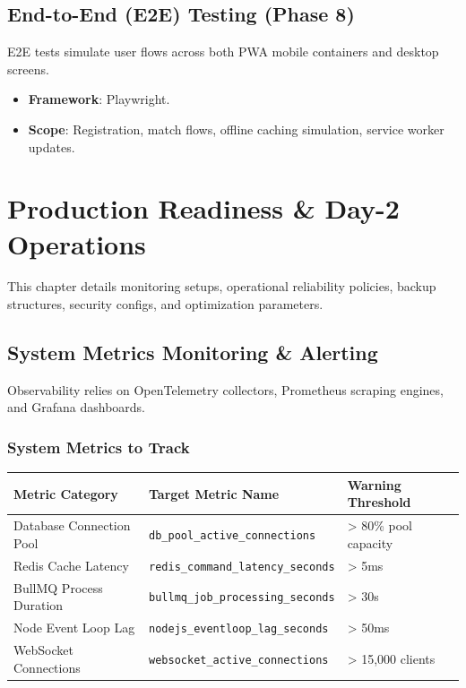 \documentclass[11pt,a4paper]{report}
\begin{document}
\section{End-to-End (E2E) Testing (Phase 8)}
E2E tests simulate user flows across both PWA mobile containers and desktop screens.
\begin{itemize}
    \item \textbf{Framework}: Playwright.
    \item \textbf{Scope}: Registration, match flows, offline caching simulation, service worker updates.
\end{itemize}


\chapter{Production Readiness \& Day-2 Operations}


This chapter details monitoring setups, operational reliability policies, backup structures, security configs, and optimization parameters.

\section{System Metrics Monitoring \& Alerting}
Observability relies on OpenTelemetry collectors, Prometheus scraping engines, and Grafana dashboards.

\subsection{System Metrics to Track}
\begin{longtable}{lll}
\toprule
\textbf{Metric Category} & \textbf{Target Metric Name} & \textbf{Warning Threshold} \\
\midrule
\endhead
\bottomrule
\endlastfoot
Database Connection Pool & \texttt{db\_pool\_active\_connections} & > 80\% pool capacity \\
Redis Cache Latency & \texttt{redis\_command\_latency\_seconds} & > 5ms \\
BullMQ Process Duration & \texttt{bullmq\_job\_processing\_seconds} & > 30s \\
Node Event Loop Lag & \texttt{nodejs\_eventloop\_lag\_seconds} & > 50ms \\
WebSocket Connections & \texttt{websocket\_active\_connections} & > 15,000 clients \\
\end{longtable}
\end{document}
